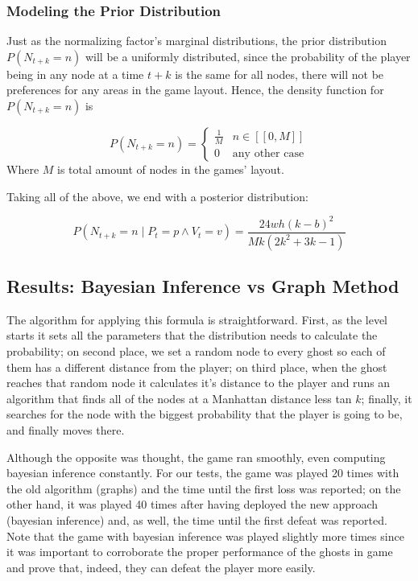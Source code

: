 \subsubsection{Modeling the Prior Distribution}
Just as the normalizing factor's marginal distributions, the prior distribution $P(N_{t+k}=n)$ will be a uniformly distributed, since the probability of the player being in any node at a time $t+k$ is the same for all nodes, there will not be preferences for any areas in the game layout. Hence, the density function for $P(N_{t+k}=n)$ is

\begin{equation}
	P\left( N_{t+k}=n \right)=
    \begin{cases}
    \frac{1}{M} &  n\in[[0,M]]\\ 
    0 & \text{any other case}
    \end{cases}
\end{equation}
Where $M$ is total amount of nodes in the games' layout.

Taking all of the above, we end with a posterior distribution:

\begin{equation}
P({ N }_{ t+k }=n\mid { P }_{ t }=p\wedge { V }_{ t}=v)=\frac{24wh(k-b)^2}{Mk(2k^2 + 3k-1)}
\end{equation}

\subsection{Results: Bayesian Inference vs Graph Method}
The algorithm for applying this formula is straightforward. First, as the level starts it sets all the parameters that the distribution needs to calculate the probability; on second place, we set a random node to every ghost so each of them has a different distance from the player; on third place, when the ghost reaches that random node it calculates it's distance to the player and runs an algorithm that finds all of the nodes at a Manhattan distance \cite{manhattan} less tan $k$; finally, it searches for the node with the biggest probability that the player is going to be, and finally moves there.

Although the opposite was thought, the game ran smoothly, even computing bayesian inference constantly. For our tests, the game was played 20 times with the old algorithm (graphs) and the time until the first loss was reported; on the other hand, it was played 40 times after having deployed the new approach (bayesian inference) and, as well, the time until the first defeat was reported. Note that the game with bayesian inference was played slightly more times since it was important to corroborate the proper performance of the ghosts in game and prove that, indeed, they can defeat the player more easily.

